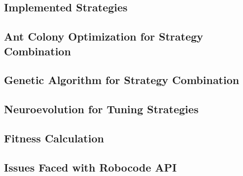\subsection{Implemented Strategies}


\subsection{Ant Colony Optimization for Strategy Combination}


\subsection{Genetic Algorithm for Strategy Combination}


\subsection{Neuroevolution for Tuning Strategies}


\subsection{Fitness Calculation}


\subsection{Issues Faced with Robocode API}

